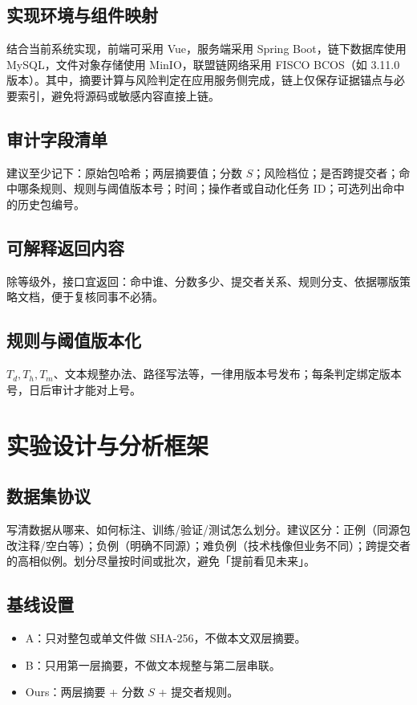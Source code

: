 \documentclass[UTF8,a4paper,zihao=5]{ctexart}
\begin{document}
\subsection{实现环境与组件映射}
结合当前系统实现，前端可采用 Vue，服务端采用 Spring Boot，链下数据库使用 MySQL，文件对象存储使用 MinIO，联盟链网络采用 FISCO BCOS（如 3.11.0 版本）。其中，摘要计算与风险判定在应用服务侧完成，链上仅保存证据锚点与必要索引，避免将源码或敏感内容直接上链。

\subsection{审计字段清单}
建议至少记下：原始包哈希；两层摘要值；分数 $S$；风险档位；是否跨提交者；命中哪条规则、规则与阈值版本号；时间；操作者或自动化任务 ID；可选列出命中的历史包编号。

\subsection{可解释返回内容}
除等级外，接口宜返回：命中谁、分数多少、提交者关系、规则分支、依据哪版策略文档，便于复核同事不必猜。

\subsection{规则与阈值版本化}
$T_d,T_h,T_m$、文本规整办法、路径写法等，一律用版本号发布；每条判定绑定版本号，日后审计才能对上号。

\section{实验设计与分析框架}
\label{sec:exp}

\subsection{数据集协议}
写清数据从哪来、如何标注、训练/验证/测试怎么划分。建议区分：正例（同源包改注释/空白等）；负例（明确不同源）；难负例（技术栈像但业务不同）；跨提交者的高相似例。划分尽量按时间或批次，避免「提前看见未来」。

\subsection{基线设置}
\begin{itemize}[leftmargin=2em]
  \item A：只对整包或单文件做 SHA-256，不做本文双层摘要。
  \item B：只用第一层摘要，不做文本规整与第二层串联。
  \item Ours：两层摘要 + 分数 $S$ + 提交者规则。
\end{itemize}
\end{document}
